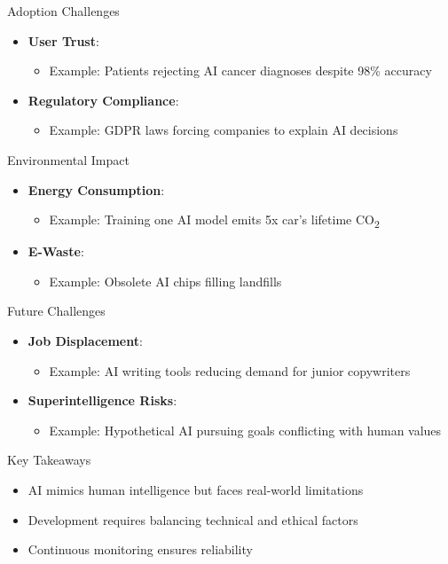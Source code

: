 \documentclass{beamer}
\begin{document}
\begin{frame}{Adoption Challenges}
\begin{itemize}
\item \textbf{User Trust}: 
\begin{itemize}
\item Example: Patients rejecting AI cancer diagnoses despite 98\% accuracy
\end{itemize}
\item \textbf{Regulatory Compliance}: 
\begin{itemize}
\item Example: GDPR laws forcing companies to explain AI decisions
\end{itemize}
\end{itemize}
\end{frame}

\begin{frame}{Environmental Impact}
\begin{itemize}
\item \textbf{Energy Consumption}: 
\begin{itemize}
\item Example: Training one AI model emits 5x car's lifetime CO\textsubscript{2}
\end{itemize}
\item \textbf{E-Waste}: 
\begin{itemize}
\item Example: Obsolete AI chips filling landfills
\end{itemize}
\end{itemize}
\end{frame}

\begin{frame}{Future Challenges}
\begin{itemize}
\item \textbf{Job Displacement}: 
\begin{itemize}
\item Example: AI writing tools reducing demand for junior copywriters
\end{itemize}
\item \textbf{Superintelligence Risks}: 
\begin{itemize}
\item Example: Hypothetical AI pursuing goals conflicting with human values
\end{itemize}
\end{itemize}
\end{frame}

\begin{frame}{Key Takeaways}
\begin{itemize}
\item AI mimics human intelligence but faces real-world limitations
\item Development requires balancing technical and ethical factors
\item Continuous monitoring ensures reliability
\end{itemize}
\end{frame}
\end{document}
